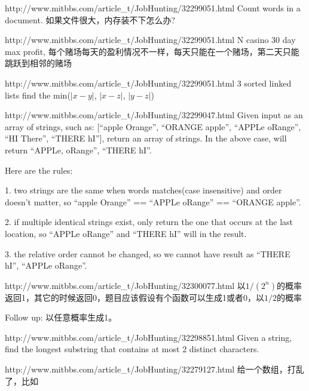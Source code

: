 \documentclass[a4paper]{article}
\begin{document}
\begin{CJK}{UTF8}{gbsn}
\begin{enumerate}
\begin{Q}[Apple]{http://www.mitbbs.com/article_t/JobHunting/32299051.html}
Count words in a document. 如果文件很大，内存装不下怎么办?
\end{Q}

\begin{Q}[Apple]{http://www.mitbbs.com/article_t/JobHunting/32299051.html}
N casino 30 day max profit, 每个赌场每天的盈利情况不一样，每天只能在一个赌场，第二天只能跳跃到相邻的赌场
\end{Q}

\begin{Q}[Apple]{http://www.mitbbs.com/article_t/JobHunting/32299051.html}
3 sorted linked lists find the min($|x-y|$, $|x-z|$, $|y-z|$)
\end{Q}

\begin{Q}{http://www.mitbbs.com/article_t/JobHunting/32299047.html}
Given input as an array of strings, such as: [``apple Orange'', ``ORANGE apple'', ``APPLe oRange'', ``HI There'', ``THERE hI''], return an array of strings. In the above case, will return ``APPLe, oRange'', ``THERE hI''.

Here are the rules:

1. two strings are the same when words matches(case insensitive) and order doesn't matter, so ``apple Orange'' == ``APPLe oRange'' == ``ORANGE apple''.

2. if multiple identical strings exist, only return the one that occurs at the last location, so ``APPLe oRange'' and ``THERE hI'' will in the result.

3.  the relative order cannot be changed, so we cannot have result as ``THERE hI'', ``APPLe oRange''.
\end{Q}

\begin{Q}[Google]{http://www.mitbbs.com/article_t/JobHunting/32300077.html}
以$1/(2^n)$的概率返回1，其它的时候返回0，题目应该假设有个函数可以生成1或者0，以$1/2$的概率

Follow up: 以任意概率生成1。
\end{Q}

\begin{Q}[Google]{http://www.mitbbs.com/article_t/JobHunting/32298851.html}
Given a string, find the longest substring that contains at most 2 distinct characters.
\end{Q}

\begin{Q}[Google]{http://www.mitbbs.com/article_t/JobHunting/32279127.html}
给一个数组，打乱了，比如


\end{Q}
\end{enumerate}
\end{CJK}
\end{document}
